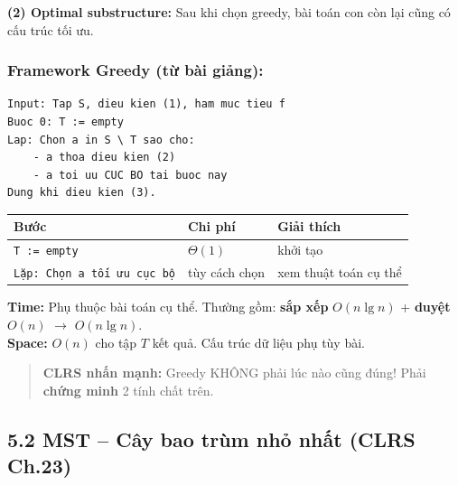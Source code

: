 \documentclass[10pt]{article}
\begin{document}
\textbf{(2) Optimal substructure:} Sau khi chọn greedy, bài toán con còn
lại cũng có cấu trúc tối ưu.

\subsubsection{Framework Greedy (từ bài
giảng):}\label{framework-greedy-tux1eeb-buxe0i-giux1ea3ng}

\begin{tcolorbox}[colback=gray!8, colframe=gray!50, boxrule=0.5pt, arc=2pt,
  left=6pt, right=6pt, top=4pt, bottom=4pt,
  title={\small\textbf{Pseudocode 12: Greedy Framework}}]
\begin{verbatim}
Input: Tap S, dieu kien (1), ham muc tieu f
Buoc 0: T := empty
Lap: Chon a in S \ T sao cho:
    - a thoa dieu kien (2)
    - a toi uu CUC BO tai buoc nay
Dung khi dieu kien (3).
\end{verbatim}
\end{tcolorbox}

\begin{tcolorbox}[colback=yellow!5, colframe=orange!50, boxrule=0.5pt, arc=2pt, title={\small\textbf{Phân tích Complexity -- Greedy Framework (tổng quát)}}]
\begin{tabular}{|l|l|l|}
\hline
\textbf{Bước} & \textbf{Chi phí} & \textbf{Giải thích} \\
\hline
\texttt{T := empty} & $\Theta(1)$ & khởi tạo \\
\hline
\texttt{Lặp: Chọn a tối ưu cục bộ} & tùy cách chọn & xem thuật toán cụ thể \\
\hline
\end{tabular}
\vspace{0.2cm}

\textbf{Time:} Phụ thuộc bài toán cụ thể. Thường gồm: \textbf{sắp xếp} $O(n\lg n)$ + \textbf{duyệt} $O(n)$ $\to$ $O(n\lg n)$.\\
\textbf{Space:} $O(n)$ cho tập $T$ kết quả. Cấu trúc dữ liệu phụ tùy bài.
\end{tcolorbox}

\begin{quote}
\textbf{CLRS nhấn mạnh:} Greedy KHÔNG phải lúc nào cũng đúng! Phải
\textbf{chứng minh} 2 tính chất trên.
\end{quote}

\subsection{5.2 MST -- Cây bao trùm nhỏ nhất (CLRS
Ch.23)}\label{mst-cuxe2y-bao-truxf9m-nhux1ecf-nhux1ea5t-clrs-ch.23}
\end{document}

